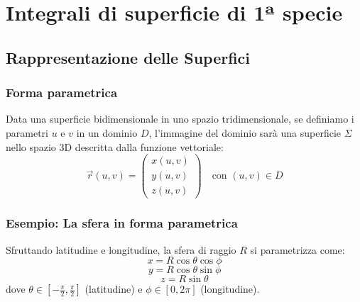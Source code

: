 \usetikzlibrary{calc, arrows.meta, positioning, 3d}

\chapter{Integrali di superficie di 1ª specie}

\section{Rappresentazione delle Superfici}

\subsection{Forma parametrica}
Data una superficie bidimensionale in uno spazio tridimensionale, se definiamo i parametri $u$ e $v$ in un dominio $D$, l'immagine del dominio sarà una superficie $\Sigma$ nello spazio 3D descritta dalla funzione vettoriale:
\begin{equation}
    \vec{r}(u,v) = \begin{pmatrix} x(u,v) \\ y(u,v) \\ z(u,v) \end{pmatrix} \quad \text{con } (u,v) \in D
\end{equation}



\subsection{Esempio: La sfera in forma parametrica}
Sfruttando latitudine e longitudine, la sfera di raggio $R$ si parametrizza come:
$$ x = R \cos\theta \cos\phi $$
$$ y = R \cos\theta \sin\phi $$
$$ z = R \sin\theta $$
dove $\theta \in \left[-\frac{\pi}{2}, \frac{\pi}{2}\right]$ (latitudine) e $\phi \in [0, 2\pi]$ (longitudine).

